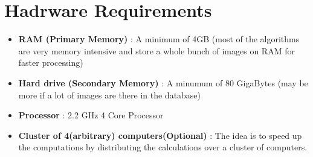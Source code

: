 \section{Hadrware Requirements}
\begin{itemize}
\item \textbf{RAM (Primary Memory)} : A minimum of 4GB (most of the algorithms are very memory intensive and store a whole bunch of images on RAM for faster processing)
\item \textbf{Hard drive (Secondary Memory)} : A minumum of 80 GigaBytes (may be more if a lot of images are there in the database)
\item \textbf{Processor} : 2.2 GHz 4 Core Processor 
\item \textbf{Cluster of 4(arbitrary) computers(Optional)} : The idea is to speed up the computations by distributing the calculations over a cluster of computers.
\end{itemize}

